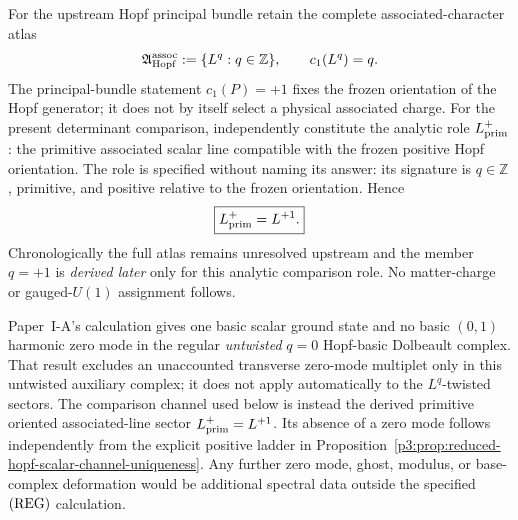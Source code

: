 \documentclass[12pt,a4paper]{article}
\begin{document}
\begin{definition}
\label{p3c:def:primitive-oriented-associated-line}
For the upstream Hopf principal bundle retain the complete associated-character
atlas
\[
 \mathfrak A_{\rm Hopf}^{\rm assoc}
 :=\{L^q:q\in\mathbb Z\},
 \qquad c_1(L^q)=q.
\]
The principal-bundle statement \(c_1(P)=+1\) fixes the frozen orientation of
the Hopf generator; it does not by itself select a physical associated charge.
For the present determinant comparison, independently constitute the analytic
role \(L_{\rm prim}^{+}\): the primitive associated scalar line compatible
with the frozen positive Hopf orientation.  The role is specified without
naming its answer: its signature is
\(q\in\mathbb Z\), primitive, and positive relative to the frozen orientation.
Hence
\[
 \boxed{L_{\rm prim}^{+}=L^{+1}.}
\]
Chronologically the full atlas remains unresolved upstream and the member
\(q=+1\) is \emph{derived later} only for this analytic comparison role.  No
matter-charge or gauged-\(U(1)\) assignment follows.
\end{definition}

\begin{remark}
\label{p3:rem:no-hidden-basic-dolbeault-zero-mode}
Paper~I-A's calculation gives one basic scalar ground state and no basic
\((0,1)\) harmonic zero mode in the regular \emph{untwisted} \(q=0\)
Hopf-basic Dolbeault complex.  That result excludes an unaccounted transverse
zero-mode multiplet only in this untwisted auxiliary complex; it does not
apply automatically to the \(L^q\)-twisted sectors.  The comparison channel used below is instead the derived primitive oriented
associated-line sector \(L_{\rm prim}^{+}=L^{+1}\).  Its absence of a
zero mode follows independently from the explicit positive ladder in
Proposition~\ref{p3:prop:reduced-hopf-scalar-channel-uniqueness}.  Any further
zero mode, ghost, modulus, or base-complex deformation would be additional
spectral data outside the specified \(({\rm REG})\) calculation.
\end{remark}
\end{document}
